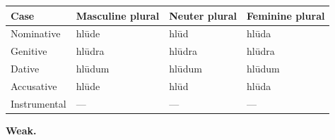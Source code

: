 \par\begin{minipage}{\linewidth}\raggedright
\setlength{\LTleft}{0pt}\setlength{\LTright}{\fill}
\noindent
\begin{tabular}{@{}>{\raggedright\arraybackslash}p{22mm}>{\raggedright\arraybackslash}p{31.18mm}>{\raggedright\arraybackslash}p{31.18mm}>{\raggedright\arraybackslash}p{31.18mm}@{}}
\toprule
\textbf{Case} & \textbf{Masculine plural} & \textbf{Neuter plural} & \textbf{Feminine plural} \\
\midrule
Nominative & hlūde & hlūd & hlūda \\
Genitive & hlūdra & hlūdra & hlūdra \\
Dative & hlūdum & hlūdum & hlūdum \\
Accusative & hlūde & hlūd & hlūda \\
Instrumental & — & — & — \\
\bottomrule
\end{tabular}
\end{minipage}\par
\par\endgroup
\par\addvspace{5pt}

\textbf{Weak.}

